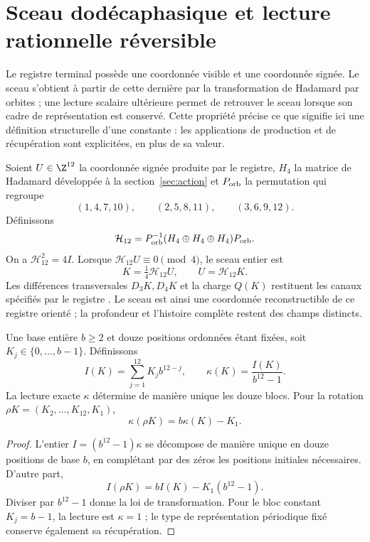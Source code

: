 \section{Sceau dodécaphasique et lecture rationnelle réversible}
\label{sec:sello}

Le registre terminal possède une coordonnée visible et une coordonnée
signée. Le sceau s'obtient à partir de cette dernière par la transformation
de Hadamard par orbites ; une lecture scalaire ultérieure permet de retrouver
le sceau lorsque son cadre de représentation est conservé. Cette propriété
précise ce que signifie ici une définition structurelle d'une constante :
les applications de production et de récupération sont explicitées, en plus de sa valeur.

Soient $U\in\Z^{12}$ la coordonnée signée produite par le registre,
$H_4$ la matrice de Hadamard développée à la section~\ref{sec:action}
et $P_{\rm orb}$ la permutation qui regroupe
\[
 (1,4,7,10),\qquad(2,5,8,11),\qquad(3,6,9,12).
\]
Définissons
\[
 \mathcal H_{12}=P_{\rm orb}^{-1}
 (H_4\oplus H_4\oplus H_4)P_{\rm orb}.
\]
On a $\mathcal H_{12}^2=4I$. Lorsque
$\mathcal H_{12}U\equiv0\pmod4$, le sceau entier est
\[
 K=\tfrac14\mathcal H_{12}U,
 \qquad U=\mathcal H_{12}K.
\]
Les différences transversales $D_3K,D_4K$ et la charge $Q(K)$ restituent
les canaux spécifiés par le registre \cite{registro}.
Le sceau est ainsi une coordonnée reconstructible de ce registre orienté ;
la profondeur et l'histoire complète restent des champs distincts.

\begin{proposition}
Une base entière $b\ge2$ et douze positions ordonnées étant fixées, soit
$K_j\in\{0,\ldots,b-1\}$. Définissons
\[
 I(K)=\sum_{j=1}^{12}K_jb^{12-j},\qquad
 \kappa(K)=\frac{I(K)}{b^{12}-1}.
\]
La lecture exacte $\kappa$ détermine de manière unique les douze blocs.
Pour la rotation $\rho K=(K_2,\ldots,K_{12},K_1)$,
\[
 \boxed{\kappa(\rho K)=b\kappa(K)-K_1.}
\]
\end{proposition}
\begin{proof}
L'entier $I=(b^{12}-1)\kappa$ se décompose de manière unique en douze
positions de base $b$, en complétant par des zéros les positions initiales
nécessaires. D'autre part,
\[
 I(\rho K)=bI(K)-K_1(b^{12}-1).
\]
Diviser par $b^{12}-1$ donne la loi de transformation. Pour le bloc
constant $K_j=b-1$, la lecture est $\kappa=1$ ; le type de représentation
périodique fixé conserve également sa récupération.
\end{proof}

